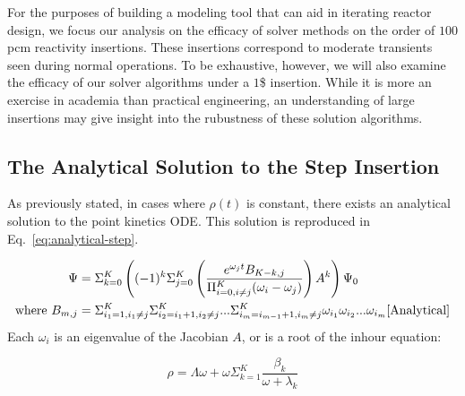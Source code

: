 \documentclass[review,onefignum,onetabnum]{siamart171218}
\begin{document}
For the purposes of building a modeling tool that can aid in iterating reactor design,
we focus our analysis on the efficacy of solver methods on the order of $100$ pcm
reactivity insertions. These insertions correspond to moderate transients seen during
normal operations. To be exhaustive, however, we will also examine the efficacy of our
solver algorithms under a $1$\$ insertion. While it is more an exercise in academia than
practical engineering, an understanding of large insertions may give insight into the
rubustness of these solution  algorithms.

\subsection{The Analytical Solution to the Step Insertion}
As previously stated, in cases where $\rho(t)$ is constant, there exists an
analytical solution to the point kinetics ODE. This solution is reproduced in
Eq.~\cref{eq:analytical-step}.

\begin{align}
  \label{eq:analytical-step}
  \Psi &= \Sigma_{k=0}^K \left( (-1)^k \Sigma_{j=0}^K \left( \frac{e^{\omega_jt}B_{K-k,j}}{\Pi_{i=0, i\neq j}^K (\omega_i - \omega_j)}\right) A^k\right)\Psi_0\\
  \text{where } B_{m,j} &= \Sigma_{i_1 = 1, i_1 \neq j}^K \Sigma_{i_2 = i_1 + 1, i_2 \neq j}^K ...\Sigma_{i_m = i_{m-1} + 1, i_m \neq j}^K \omega_{i_1}\omega_{i_2}...\omega_{i_m}
  \cite{Analytical}
\end{align}
Each $\omega_i$ is an eigenvalue of the Jacobian $A$, or is a root of the inhour
equation:

\begin{equation}
  \rho = \Lambda\omega + \omega \Sigma_{k=1}^K \frac{\beta_k}{\omega + \lambda_k}
\end{equation}
\end{document}
